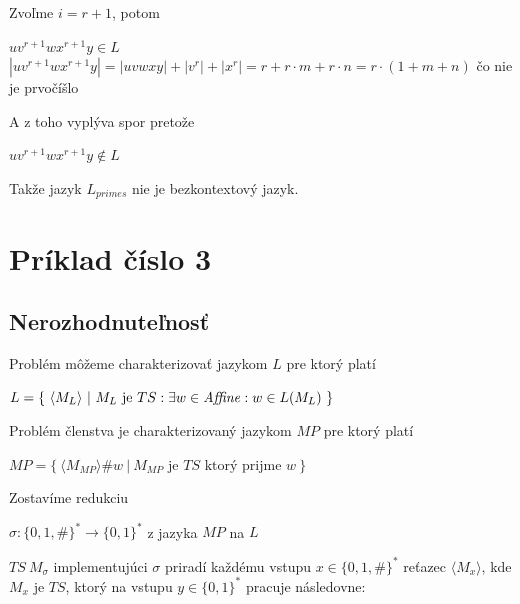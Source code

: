 \documentclass[11pt,a4paper]{article}
\begin{document}
Zvoľme $i=r+1$, potom

\begin{center}
$uv^{r+1}wx^{r+1}y \in L$\\[0.5em]
$|uv^{r+1}wx^{r+1}y| = |uvwxy| + |v^{r}| + |x^{r}| = r + r \cdot m + r \cdot n = r \cdot (1+m+n)$ čo nie je prvočíšlo\\
\end{center}

A z toho vyplýva spor pretože

\begin{center}
$uv^{r+1}wx^{r+1}y \notin L$
\end{center}

Takže jazyk $L_{primes}$ nie je bezkontextový jazyk.

\newpage
\section{Príklad číslo 3} %

\subsection{Nerozhodnuteľnosť}

Problém môžeme charakterizovať jazykom $L$ pre ktorý platí

\begin{center}
    $L = \{ \ \langle M_{L} \rangle \ | \ M_{L} \text{ je } TS: \exists w \in \text{\textit{Affine}}: w \in L(M_{L}) \ \}$
\end{center}

Problém členstva je charakterizovaný jazykom $MP$ pre ktorý platí

\begin{center}
    $MP = \{ \ \langle M_{MP} \rangle \# w  \ | \ M_{MP} \text{ je } TS \text{ ktorý prijme } w \ \}$
\end{center}

Zostavíme redukciu

\begin{center}
    $\sigma: \{0,1,\#\}^{*} \longrightarrow \{0,1\}^{*}$ z jazyka $MP$ na $L$
\end{center}

$TS \ M_{\sigma}$ implementujúci $\sigma$ priradí každému vstupu $x \in \{0,1,\#\}^{*}$ reťazec $\langle M_{x} \rangle$, kde $M_{x}$ je $TS$, ktorý na vstupu $y \in \{0,1\}^{*}$ pracuje následovne:
\end{document}
